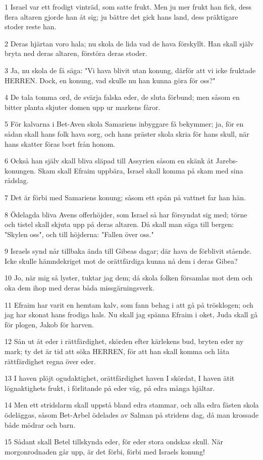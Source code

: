 \par 1 Israel var ett frodigt vinträd, som satte frukt. Men ju mer frukt han fick, dess flera altaren gjorde han åt sig; ju bättre det gick hans land, dess präktigare stoder reste han.
\par 2 Deras hjärtan voro hala; nu skola de lida vad de hava förskyllt. Han skall själv bryta ned deras altaren, förstöra deras stoder.
\par 3 Ja, nu skola de få säga: "Vi hava blivit utan konung, därför att vi icke fruktade HERREN. Dock, en konung, vad skulle nu han kunna göra för oss?"
\par 4 De tala tomma ord, de svärja falska eder, de sluta förbund; men såsom en bitter planta skjuter domen upp ur markens fåror.
\par 5 För kalvarna i Bet-Aven skola Samariens inbyggare få bekymmer; ja, för en sådan skall hans folk hava sorg, och hans präster skola skria för hans skull, när hans skatter föras bort från honom.
\par 6 Också han själv skall bliva släpad till Assyrien såsom en skänk åt Jarebs-konungen. Skam skall Efraim uppbära, Israel skall komma på skam med sina rådslag.
\par 7 Det är förbi med Samariens konung; såsom ett spån på vattnet far han hän.
\par 8 Ödelagda bliva Avens offerhöjder, som Israel så har försyndat sig med; törne och tistel skall skjuta upp på deras altaren. Då skall man säga till bergen: "Skylen oss", och till höjderna: "Fallen över oss."
\par 9 Israels synd når tillbaka ända till Gibeas dagar; där hava de förblivit stående. Icke skulle hämndekriget mot de orättfärdiga kunna nå dem i deras Gibea?
\par 10 Jo, när mig så lyster, tuktar jag dem; då skola folken församlas mot dem och oka dem ihop med deras båda missgärningsverk.
\par 11 Efraim har varit en hemtam kalv, som fann behag i att gå på trösklogen; och jag har skonat hans frodiga hals. Nu skall jag spänna Efraim i oket, Juda skall gå för plogen, Jakob för harven.
\par 12 Sån ut åt eder i rättfärdighet, skörden efter kärlekens bud, bryten eder ny mark; ty det är tid att söka HERREN, för att han skall komma och låta rättfärdighet regna över eder.
\par 13 I haven plöjt ogudaktighet, orättfärdighet haven I skördat, I haven ätit lögnaktighets frukt, i förlitande på eder väg, på edra många hjältar.
\par 14 Men ett stridslarm skall uppstå bland edra stammar, och alla edra fästen skola ödeläggas, såsom Bet-Arbel ödelades av Salman på stridens dag, då man krossade både mödrar och barn.
\par 15 Sådant skall Betel tillskynda eder, för eder stora ondskas skull. När morgonrodnaden går upp, är det förbi, förbi med Israels konung!


